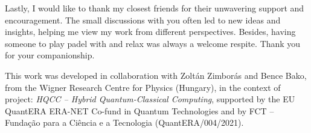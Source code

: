 Lastly, I would like to thank my closest friends for their unwavering support and encouragement. The small discussions with you often led to new ideas and insights, helping me view my work from different perspectives. Besides, having someone to play padel with and relax was always a welcome respite. Thank you for your companionship.

\vspace*{\fill}

This work was developed in collaboration with Zoltán Zimborás and Bence Bako, from the Wigner Research Centre for Physics (Hungary), in the context of project: \textit{HQCC – Hybrid Quantum-Classical Computing}, supported by the EU QuantERA ERA-NET Co-fund in Quantum Technologies and by FCT -- Funda\c{c}\~{a}o para a Ci\^{e}ncia e a Tecnologia (QuantERA/004/2021).


